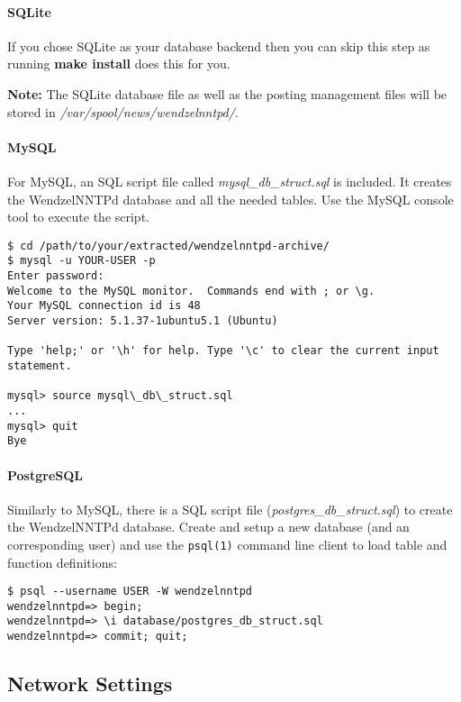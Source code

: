 \documentclass[12pt,fleqn,leqno]{scrbook}
\begin{document}
\hypertarget{sqlite-1}{%
\paragraph{SQLite}\label{sqlite-1}}

If you chose SQLite as your database backend then you can skip this step
as running \textbf{make install} does this for you.

\textbf{Note:} The SQLite database file as well as the posting
management files will be stored in \emph{/var/spool/news/wendzelnntpd/}.

\hypertarget{mysql-1}{%
\paragraph{MySQL}\label{mysql-1}}

For MySQL, an SQL script file called \emph{mysql\_db\_struct.sql} is
included. It creates the WendzelNNTPd database and all the needed
tables. Use the MySQL console tool to execute the script.

\begin{verbatim}
$ cd /path/to/your/extracted/wendzelnntpd-archive/
$ mysql -u YOUR-USER -p
Enter password:
Welcome to the MySQL monitor.  Commands end with ; or \g.
Your MySQL connection id is 48
Server version: 5.1.37-1ubuntu5.1 (Ubuntu)

Type 'help;' or '\h' for help. Type '\c' to clear the current input statement.

mysql> source mysql\_db\_struct.sql
...
mysql> quit
Bye
\end{verbatim}

\hypertarget{postgresql-1}{%
\paragraph{PostgreSQL}\label{postgresql-1}}

Similarly to MySQL, there is a SQL script file
(\emph{postgres\_db\_struct.sql}) to create the WendzelNNTPd database.
Create and setup a new database (and an corresponding user) and use the
\texttt{psql(1)} command line client to load table and function
definitions:

\begin{verbatim}
$ psql --username USER -W wendzelnntpd
wendzelnntpd=> begin;
wendzelnntpd=> \i database/postgres_db_struct.sql
wendzelnntpd=> commit; quit;
\end{verbatim}

\hypertarget{network-settings-1}{%
\subsection{Network Settings}\label{network-settings-1}}
\end{document}
